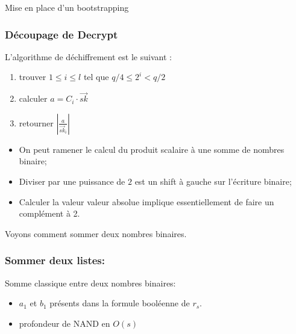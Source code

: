 \documentclass[10pt,xcolor={usenames,dvipsnames}]{beamer}
\begin{document}
\begin{section}{Mise en place d'un bootstrapping}
\begin{frame}
\end{frame} 


\begin{frame}
\frametitle{Découpage de Decrypt}
L'algorithme de déchiffrement est le suivant :
\begin{enumerate}
\item trouver $1 \leqslant i \leqslant l$ tel que $q/4 \leqslant 2^i < q/2$
\item calculer $a = C_i \cdot \vec{sk}$
\item retourner $|\frac{a}{\vec{sk}_i}|$
\end{enumerate}

\begin{itemize}
\item On peut ramener le calcul du produit scalaire à une somme de nombres binaire;
\item Diviser par une puissance de $2$ est un shift à gauche sur l'écriture binaire;
\item Calculer la valeur valeur absolue implique essentiellement de faire un complément à 2.
\end{itemize}

Voyons comment sommer deux nombres binaires.

\end{frame} 


\begin{frame} 
\frametitle{Sommer deux listes: }
Somme classique entre deux nombres binaires:
  \begin{figure}
    \begin{center}
      \begin{tikzpicture}[scale = 1.2, transform shape]
      	
      \end{tikzpicture}
    \end{center}
  \end{figure}
\begin{itemize}
\item $a_1$ et $b_1$ présents dans la formule booléenne de $r_s$.
\item profondeur de NAND en $O(s)$
\end{itemize}
\end{frame} 
    

\end{section}
\end{document}
